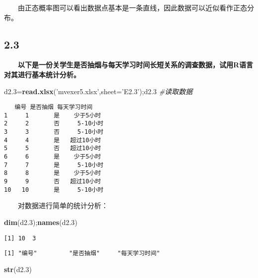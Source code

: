 \documentclass[
]{article}
\newenvironment{Shaded}{\begin{snugshade}}{\end{snugshade}}
\newcommand{\CommentTok}[1]{\textcolor[rgb]{0.56,0.35,0.01}{\textit{#1}}}
\newcommand{\DataTypeTok}[1]{\textcolor[rgb]{0.13,0.29,0.53}{#1}}
\newcommand{\FloatTok}[1]{\textcolor[rgb]{0.00,0.00,0.81}{#1}}
\newcommand{\KeywordTok}[1]{\textcolor[rgb]{0.13,0.29,0.53}{\textbf{#1}}}
\newcommand{\NormalTok}[1]{#1}
\newcommand{\StringTok}[1]{\textcolor[rgb]{0.31,0.60,0.02}{#1}}
\begin{document}
　　由正态概率图可以看出数据点基本是一条直线，因此数据可以近似看作正态分布。

\hypertarget{section-4}{%
\subsection{2.3}\label{section-4}}

　　\textbf{以下是一份关学生是否抽烟与每天学习时间长短关系的调查数据，试用R语言对其进行基本统计分析。}

\begin{Shaded}
\begin{Highlighting}[]
\NormalTok{d2}\FloatTok{.3}\NormalTok{=}\KeywordTok{read.xlsx}\NormalTok{(}\StringTok{'mvexer5.xlsx'}\NormalTok{,}\DataTypeTok{sheet=}\StringTok{'E2.3'}\NormalTok{);d2}\FloatTok{.3}  \CommentTok{#读取数据}
\end{Highlighting}
\end{Shaded}

\begin{verbatim}
   编号 是否抽烟 每天学习时间
1     1       是    少于5小时
2     2       否     5-10小时
3     3       否     5-10小时
4     4       是   超过10小时
5     5       否   超过10小时
6     6       是    少于5小时
7     7       是     5-10小时
8     8       是    少于5小时
9     9       否   超过10小时
10   10       是     5-10小时
\end{verbatim}

　　对数据进行简单的统计分析：

\begin{Shaded}
\begin{Highlighting}[]
\KeywordTok{dim}\NormalTok{(d2}\FloatTok{.3}\NormalTok{);}\KeywordTok{names}\NormalTok{(d2}\FloatTok{.3}\NormalTok{)                       }
\end{Highlighting}
\end{Shaded}

\begin{verbatim}
[1] 10  3
\end{verbatim}

\begin{verbatim}
[1] "编号"         "是否抽烟"     "每天学习时间"
\end{verbatim}

\begin{Shaded}
\begin{Highlighting}[]
\KeywordTok{str}\NormalTok{(d2}\FloatTok{.3}\NormalTok{)                                   }
\end{Highlighting}
\end{Shaded}
\end{document}
